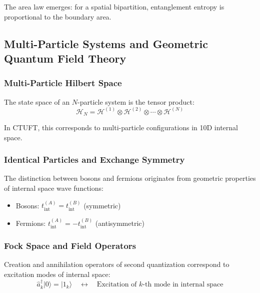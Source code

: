 The area law emerges: for a spatial bipartition, entanglement entropy is proportional to the boundary area.

\subsection{Multi-Particle Systems and Geometric Quantum Field Theory}

\subsubsection{Multi-Particle Hilbert Space}

The state space of an $N$-particle system is the tensor product:
\begin{equation}
    \mathcal{H}_N = \mathcal{H}^{(1)} \otimes \mathcal{H}^{(2)} \otimes \cdots \otimes \mathcal{H}^{(N)}
\end{equation}

In CTUFT, this corresponds to multi-particle configurations in 10D internal space.

\subsubsection{Identical Particles and Exchange Symmetry}

\begin{insight}
The distinction between bosons and fermions originates from geometric properties of internal space wave functions:
\begin{itemize}
    \item Bosons: $t_{\text{int}}^{(A)} = t_{\text{int}}^{(B)}$ (symmetric)
    \item Fermions: $t_{\text{int}}^{(A)} = -t_{\text{int}}^{(B)}$ (antisymmetric)
\end{itemize}
\end{insight}

\subsubsection{Fock Space and Field Operators}

Creation and annihilation operators of second quantization correspond to excitation modes of internal space:
\begin{equation}
    \hat{a}_k^\dagger |0\rangle = |1_k\rangle \quad \leftrightarrow \quad \text{Excitation of }k\text{-th mode in internal space}
\end{equation}

